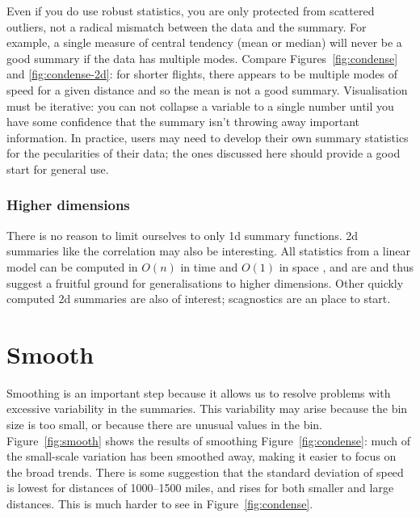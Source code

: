 \documentclass[journal]{vgtc}                %
\begin{document}
Even if you do use robust statistics, you are only protected from scattered outliers, not a radical mismatch between the data and the summary. For example, a single measure of central tendency (mean or median) will never be a good summary if the data has multiple modes. Compare Figures~\ref{fig:condense} and \ref{fig:condense-2d}: for shorter flights, there appears to be multiple modes of speed for a given distance and so the mean is not a good summary. Visualisation must be iterative: you can not collapse a variable to a single number until you have some confidence that the summary isn't throwing away important information. In practice, users may need to develop their own summary statistics for the pecularities of their data; the ones discussed here should provide a good start for general use.

\subsubsection{Higher dimensions}

There is no reason to limit ourselves to only 1d summary functions. 2d summaries like the correlation may also be interesting. All statistics from a linear model can be computed in $O(n)$ in time and $O(1)$ in space \citep{miller:1992}, and are and thus suggest a fruitful ground for generalisations to higher dimensions. Other quickly computed 2d summaries are also of interest; scagnostics \citep{wilkinson:2005} are an place to start.

\section{Smooth}
\label{sec:smooth}

Smoothing is an important step because it allows us to resolve problems with excessive variability in the summaries. This variability may arise because the bin size is too small, or because there are unusual values in the bin. Figure~\ref{fig:smooth} shows the results of smoothing Figure~\ref{fig:condense}: much of the small-scale variation has been smoothed away, making it easier to focus on the broad trends. There is some suggestion that the standard deviation of speed is lowest for distances of 1000--1500 miles, and rises for both smaller and large distances. This is much harder to see in Figure~\ref{fig:condense}.
\end{document}
